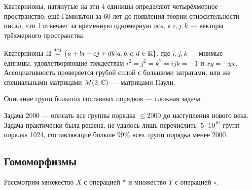\documentclass[a4paper]{report}
\begin{document}
{{{                Кватернионы, натянутые на эти 4 единицы определяют четырёхмерное пространство; ещё Гамильтон за 60 лет до появления теории относительности писал, что 1 отвечает за временную одномерную ось, а $i, j, k$ --- векторы трёхмерного пространства.

                Кватернионы $\mathbb{H} \overset{def}{=} \left\{a + bi + cj + dk\middle|a, b, c, d \in \mathbb{R}\right\}$, где $i, j, k$ --- мнимые единицы, удовлетворяющие тождествам $i^2 = j^2 = k^2 =ijk = -1$ и $xy = -yx$. Ассоциативность проверяется грубой силой с большими затратами, или же специальными матрицами $M(2, \mathbb{C})$ --- матрицами Паули.}


            Описание групп больш$\acute{\text{и}}$х составных порядков --- сложная задача.

            Задача 2000 --- описать все группы порядка $\le 2000$ до наступления нового века. Задача практически была решена, не удалось лишь перечислить $~ 5 \cdot 10^{10}$ групп порядка 1024, составляющие больше $99\%$ всех групп порядка менее $2000$.

        }
    }

    \subsection{Гомоморфизмы}
    Рассмотрим множество $X$ с операцией $*$ и множество $Y$ с операцией $\circ$.
\end{document}
